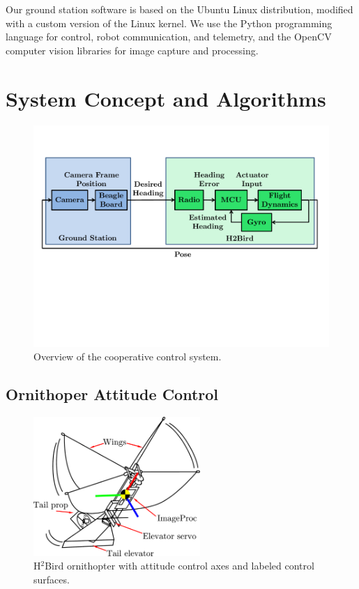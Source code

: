 \documentclass{aamas2013}
\begin{document}
Our ground station software is based on the Ubuntu Linux distribution, 
modified with a custom version of the Linux kernel. We use the Python 
programming language for control, robot communication, and telemetry, and 
the OpenCV computer vision libraries for image capture and processing.
\section{System Concept and Algorithms}

\begin{figure}[tb]
\centering
\includegraphics[width=\linewidth]{figures/process_flow.pdf}
\caption{Overview of the cooperative control system.}
\label{fig:process_flow}
\end{figure}

\subsection{Ornithoper Attitude Control}

\begin{figure}[!tb]
\centering
\includegraphics[height=150pt]{figures/h2bird_axes.pdf}
\caption{H$^2$Bird ornithopter with attitude control axes and labeled control surfaces.}
\label{fig:h2Bird_axes}
\end{figure}
\end{document}

